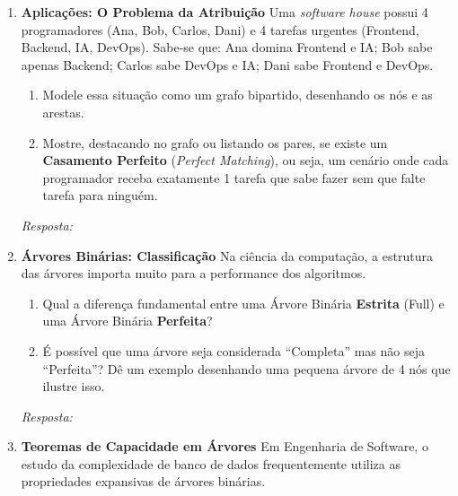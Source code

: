 \documentclass[12pt]{article}
\newcommand{\quadro}[1]{\vspace{0.2cm}\begin{tcolorbox}[colback=white, colframe=black, height=#1, boxrule=0.5pt, arc=0pt] \textit{Resposta:} \end{tcolorbox}}
\begin{document}
\begin{enumerate}[label=\textbf{\arabic*.}]
\item \textbf{Aplicações: O Problema da Atribuição}
Uma \textit{software house} possui 4 programadores (Ana, Bob, Carlos, Dani) e 4 tarefas urgentes (Frontend, Backend, IA, DevOps). Sabe-se que: Ana domina Frontend e IA; Bob sabe apenas Backend; Carlos sabe DevOps e IA; Dani sabe Frontend e DevOps.
\begin{enumerate}[label=\alph*)]
    \item Modele essa situação como um grafo bipartido, desenhando os nós e as arestas.
    \item Mostre, destacando no grafo ou listando os pares, se existe um \textbf{Casamento Perfeito} (\textit{Perfect Matching}), ou seja, um cenário onde cada programador receba exatamente 1 tarefa que sabe fazer sem que falte tarefa para ninguém.
\end{enumerate}
\quadro{6cm}

\item \textbf{Árvores Binárias: Classificação}
Na ciência da computação, a estrutura das árvores importa muito para a performance dos algoritmos.
\begin{enumerate}[label=\alph*)]
    \item Qual a diferença fundamental entre uma Árvore Binária \textbf{Estrita} (Full) e uma Árvore Binária \textbf{Perfeita}?
    \item É possível que uma árvore seja considerada ``Completa'' mas não seja ``Perfeita''? Dê um exemplo desenhando uma pequena árvore de 4 nós que ilustre isso.
\end{enumerate}
\quadro{5cm}


\item \textbf{Teoremas de Capacidade em Árvores}
Em Engenharia de Software, o estudo da complexidade de banco de dados frequentemente utiliza as propriedades expansivas de árvores binárias.
\begin{center}
\end{center}
\end{enumerate}
\end{document}
